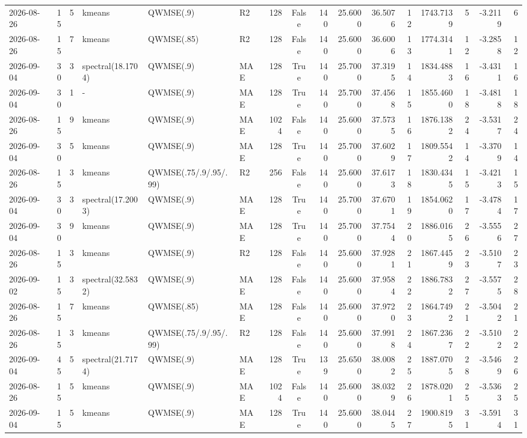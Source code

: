 \documentclass[10pt]{article}
\begin{document}
\begin{landscape}
\begin{longtable}{@{}lrrlllrcrrrrrrrr@{}}
2026-08-26 & 15 & 5 & kmeans & QWMSE(.9) & R2 & 128 & False & 140 & 25.6000 & 36.5076 & 12 & 1743.7139 & 5 & -3.2119 & 6 \\
2026-08-26 & 15 & 7 & kmeans & QWMSE(.85) & R2 & 128 & False & 140 & 25.6000 & 36.6006 & 13 & 1774.3141 & 12 & -3.2858 & 12 \\
2026-09-04 & 30 & 3 & spectral(18.1704) & QWMSE(.9) & MAE & 128 & True & 140 & 25.7000 & 37.3195 & 14 & 1834.4883 & 16 & -3.4311 & 16 \\
2026-09-04 & 30 & 1 & - & QWMSE(.9) & MAE & 128 & True & 140 & 25.7000 & 37.4568 & 15 & 1855.4600 & 18 & -3.4818 & 18 \\
2026-08-26 & 15 & 9 & kmeans & QWMSE(.9) & MAE & 1024 & False & 140 & 25.6000 & 37.5735 & 16 & 1876.1382 & 24 & -3.5317 & 24 \\
2026-09-04 & 30 & 5 & kmeans & QWMSE(.9) & MAE & 128 & True & 140 & 25.7000 & 37.6029 & 17 & 1809.5542 & 14 & -3.3709 & 14 \\
2026-08-26 & 15 & 3 & kmeans & QWMSE(.75/.9/.95/.99) & R2 & 256 & False & 140 & 25.6000 & 37.6173 & 18 & 1830.4345 & 15 & -3.4213 & 15 \\
2026-09-04 & 30 & 3 & spectral(17.2003) & QWMSE(.9) & MAE & 128 & True & 140 & 25.7000 & 37.6701 & 19 & 1854.0620 & 17 & -3.4784 & 17 \\
2026-09-04 & 30 & 9 & kmeans & QWMSE(.9) & MAE & 128 & True & 140 & 25.7000 & 37.7544 & 20 & 1886.0165 & 26 & -3.5556 & 27 \\
2026-08-26 & 15 & 3 & kmeans & QWMSE(.9) & R2 & 128 & False & 140 & 25.6000 & 37.9281 & 21 & 1867.4459 & 23 & -3.5107 & 23 \\
2026-09-02 & 15 & 3 & spectral(32.5832) & QWMSE(.9) & MAE & 128 & False & 140 & 25.6000 & 37.9584 & 22 & 1886.7832 & 27 & -3.5575 & 28 \\
2026-08-26 & 15 & 7 & kmeans & QWMSE(.85) & MAE & 128 & False & 140 & 25.6000 & 37.9720 & 23 & 1864.7492 & 21 & -3.5042 & 21 \\
2026-08-26 & 15 & 3 & kmeans & QWMSE(.75/.9/.95/.99) & R2 & 128 & False & 140 & 25.6000 & 37.9918 & 24 & 1867.2367 & 22 & -3.5102 & 22 \\
2026-09-04 & 45 & 5 & spectral(21.7174) & QWMSE(.9) & MAE & 128 & True & 139 & 25.6500 & 38.0082 & 25 & 1887.0705 & 28 & -3.5469 & 26 \\
2026-08-26 & 15 & 5 & kmeans & QWMSE(.9) & MAE & 1024 & False & 140 & 25.6000 & 38.0329 & 26 & 1878.0201 & 25 & -3.5363 & 25 \\
2026-09-04 & 15 & 5 & kmeans & QWMSE(.9) & MAE & 128 & True & 140 & 25.6000 & 38.0445 & 27 & 1900.8195 & 31 & -3.5914 & 31 \\

\end{longtable}
\end{landscape}
\end{document}
